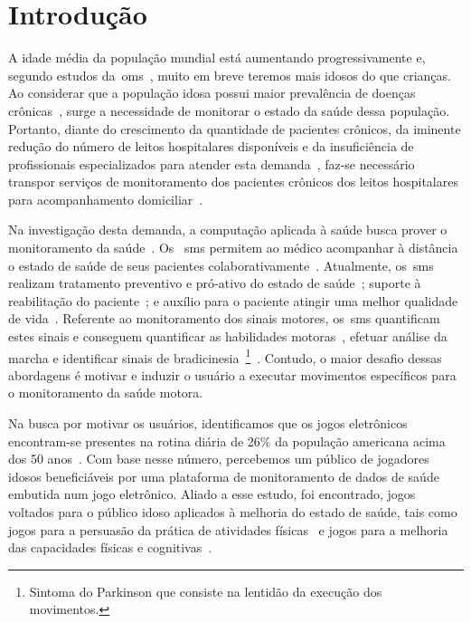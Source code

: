 \chapter{Introdu\c{c}\~{a}o} \label{chapter:intro}

A idade média da população mundial está aumentando progressivamente e, segundo estudos da~\ac{oms}~\cite{ageing2011}, muito em breve teremos mais idosos do que crianças. Ao considerar que a população idosa possui maior prevalência de doenças crônicas~\cite{prevcronica2009}, surge a necessidade de monitorar o estado da saúde dessa população. Portanto, diante do crescimento da quantidade de pacientes crônicos, da iminente redução do número de leitos hospitalares disponíveis e da insuficiência de profissionais especializados para atender esta demanda~\cite{healthmonitoring2013}, faz-se necessário transpor serviços de monitoramento dos pacientes crônicos dos leitos hospitalares para acompanhamento domiciliar~\cite{homecarebrazil2011}. 

Na investigação desta demanda, a computação aplicada à saúde busca prover o monitoramento da saúde~\cite{healthmonitoring2013,bardram2010,aarhus_negotiating_2010}. Os ~\ac{sms} permitem ao médico acompanhar à distância o estado de saúde de seus pacientes colaborativamente~\cite{healthmonitoring2013}. Atualmente, os~\ac{sms} realizam tratamento preventivo e pró-ativo do estado de saúde~\cite{bardram2010}; suporte à reabilitação do paciente~\cite{sacbespoke2014}; e auxílio para o paciente atingir uma melhor qualidade de vida~\cite{sacsvmhms2014}. Referente ao monitoramento dos sinais motores, os~\ac{sms} quantificam estes sinais e conseguem quantificar as habilidades motoras~\cite{manumeterjbhi2014,patel_monitoring_2009}, efetuar análise da marcha \cite{robotgait2014} e identificar sinais de bradicinesia~\footnote{Sintoma do Parkinson que consiste na lentidão da execução dos movimentos.}~\cite{ambulatoryparkinson2010}. Contudo, o maior desafio dessas abordagens é motivar e induzir o usuário a executar movimentos específicos para o monitoramento da saúde motora.

Na busca por motivar os usuários, identificamos que os jogos eletrônicos encontram-se presentes na rotina diária de 26\% da população americana acima dos 50 anos~\cite{esa2016}. Com base nesse número, percebemos um público de jogadores idosos beneficiáveis por uma plataforma de monitoramento de dados de saúde embutida num jogo eletrônico. Aliado a esse estudo, foi encontrado, jogos voltados para o público idoso aplicados à melhoria do estado de saúde, tais como jogos para a persuasão da prática de atividades físicas~\cite{brox11} e jogos para a melhoria das capacidades físicas e cognitivas~\cite{arntzen2011}. 

